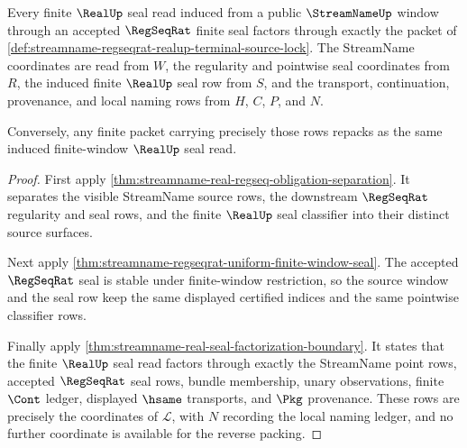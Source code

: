 \begin{theorem}
\label{thm:streamname-regseqrat-realup-terminal-source-lock}
Every finite $\RealUp$ seal read induced from a public $\StreamNameUp$ window
through an accepted $\RegSeqRat$ finite seal factors through exactly the packet
of \autoref{def:streamname-regseqrat-realup-terminal-source-lock}. The
StreamName coordinates are read from $W$, the regularity and pointwise seal
coordinates from $R$, the induced finite $\RealUp$ seal row from $S$, and the
transport, continuation, provenance, and local naming rows from $H$, $C$, $P$,
and $N$.

Conversely, any finite packet carrying precisely those rows repacks as the
same induced finite-window $\RealUp$ seal read.
\end{theorem}
\begin{proof}
First apply
\autoref{thm:streamname-real-regseq-obligation-separation}. It separates the
visible StreamName source rows, the downstream $\RegSeqRat$ regularity and
seal rows, and the finite $\RealUp$ seal classifier into their distinct source
surfaces.

Next apply \autoref{thm:streamname-regseqrat-uniform-finite-window-seal}. The
accepted $\RegSeqRat$ seal is stable under finite-window restriction, so the
source window and the seal row keep the same displayed certified indices and
the same pointwise classifier rows.

Finally apply \autoref{thm:streamname-real-seal-factorization-boundary}. It
states that the finite $\RealUp$ seal read factors through exactly the
StreamName point rows, accepted $\RegSeqRat$ seal rows, bundle membership,
unary observations, finite $\Cont$ ledger, displayed $\hsame$ transports, and
$\Pkg$ provenance. These rows are precisely the coordinates of
$\mathcal{L}$, with $N$ recording the local naming ledger, and no further
coordinate is available for the reverse packing.
\end{proof}

